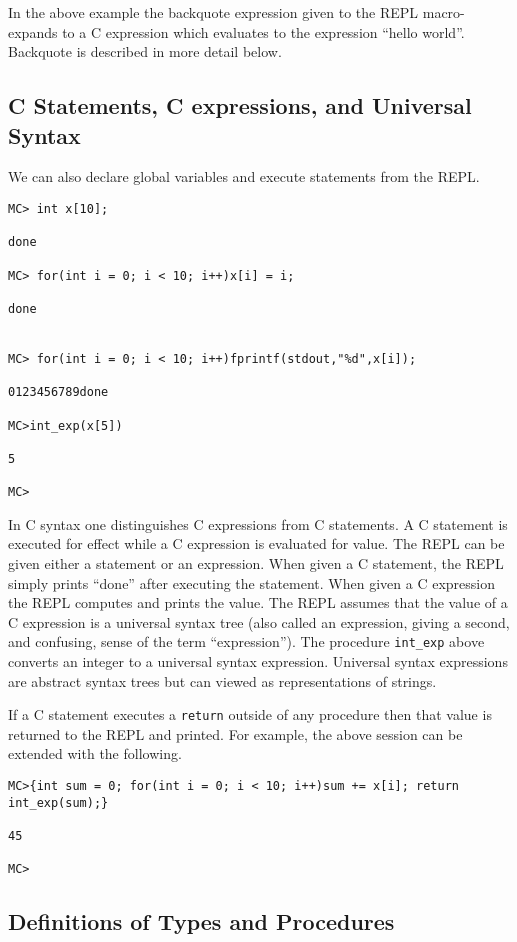 \documentclass{article}
\begin{document}
In the above example the backquote expression given to the REPL macro-expands to a C expression which evaluates to the expression ``hello world''.
Backquote is described in more detail below.

\subsection{C Statements, C expressions, and Universal Syntax}

We can also declare global variables and execute statements from the REPL.

\begin{verbatim}
MC> int x[10];

done

MC> for(int i = 0; i < 10; i++)x[i] = i;

done


MC> for(int i = 0; i < 10; i++)fprintf(stdout,"%d",x[i]);

0123456789done

MC>int_exp(x[5])

5

MC>
\end{verbatim}

In C syntax one distinguishes C expressions from C statements.  A C
statement is executed for effect while a C expression is evaluated for
value. The REPL can be given either a statement or an expression.  When
given a C statement, the REPL simply prints ``done'' after executing
the statement.
When given a C expression the REPL computes and prints
the value.  The REPL assumes that the value of a C expression
is a universal syntax tree (also called an expression, giving a second, and confusing,
sense of the term ``expression''). The procedure {\tt int\_exp} above
converts an integer to a universal syntax expression.  Universal syntax expressions are abstract
syntax trees but can viewed as representations of strings.

If a C statement executes a {\tt return} outside of any
procedure then that value is returned to the REPL and printed.
For example, the above session can be extended with the following.

\begin{verbatim}
MC>{int sum = 0; for(int i = 0; i < 10; i++)sum += x[i]; return int_exp(sum);}

45

MC>
\end{verbatim}

\subsection{Definitions of Types and Procedures}
\end{document}
